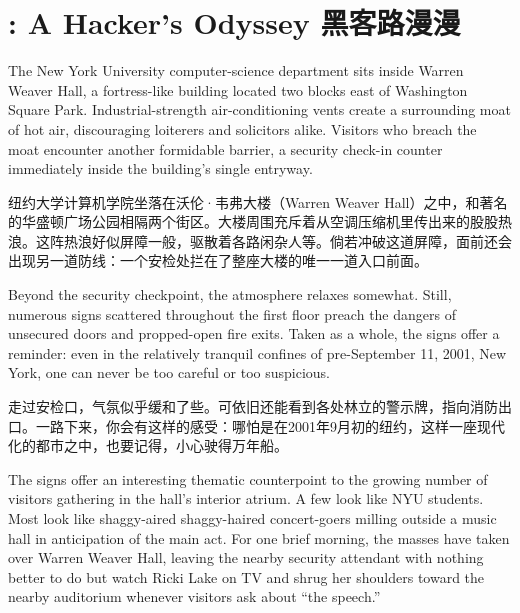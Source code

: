 \chapter{\ifdefined{}: A Hacker's Odyssey
\fi
\ifdefined\chs
黑客路漫漫
\fi}

\ifdefined\eng
The New York University computer-science department sits inside Warren Weaver Hall, a fortress-like building located two blocks east of Washington Square Park. Industrial-strength air-conditioning vents create a surrounding moat of hot air, discouraging loiterers and solicitors alike. Visitors who breach the moat encounter another formidable barrier, a security check-in counter immediately inside the building's single entryway.
\fi

\ifdefined\chs
纽约大学计算机学院坐落在沃伦·韦弗大楼（Warren Weaver Hall）之中，和著名的华盛顿广场公园相隔两个街区。大楼周围充斥着从空调压缩机里传出来的股股热浪。这阵热浪好似屏障一般，驱散着各路闲杂人等。倘若冲破这道屏障，面前还会出现另一道防线：一个安检处拦在了整座大楼的唯一一道入口前面。
\fi

\ifdefined\eng
Beyond the security checkpoint, the atmosphere relaxes somewhat. Still, numerous signs scattered throughout the first floor preach the dangers of unsecured doors and propped-open fire exits. Taken as a whole, the signs offer a reminder: even in the relatively tranquil confines of pre-September 11, 2001, New York, one can never be too careful or too suspicious.
\fi

\ifdefined\chs
走过安检口，气氛似乎缓和了些。可依旧还能看到各处林立的警示牌，指向消防出口。一路下来，你会有这样的感受：哪怕是在2001年9月初的纽约，这样一座现代化的都市之中，也要记得，小心驶得万年船。
\fi

\ifdefined\eng
The signs offer an interesting thematic counterpoint to the growing number of visitors gathering in the hall's interior atrium. A few look like NYU students. Most look like \ifdefined\vone shaggy-aired \fi\ifdefined\vtwo shaggy-haired \fi concert-goers milling outside a music hall in anticipation of the main act. For one brief morning, the masses have taken over Warren Weaver Hall, leaving the nearby security attendant with nothing better to do but watch Ricki Lake on TV and shrug her shoulders toward the nearby auditorium whenever visitors ask about ``the speech.''
\fi

